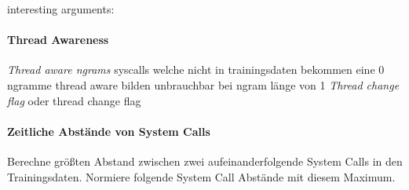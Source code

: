             interesting arguments:
            
            \paragraph{Thread Awareness}
                \textit{Thread aware ngrams}
                    syscalls welche nicht in trainingsdaten bekommen eine 0
                    ngramme thread aware bilden unbrauchbar bei ngram länge von 1
                \textit{Thread change flag}
                    oder thread change flag

            \paragraph{Zeitliche Abstände von System Calls}
                Berechne größten Abstand zwischen zwei aufeinanderfolgende System Calls in den Trainingsdaten.
                Normiere folgende System Call Abstände mit diesem Maximum.

